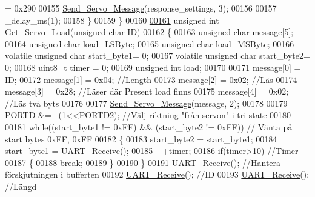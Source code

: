 \begin{DoxyCode}
{       = 0x290 }
00155         \hyperlink{servo___u_a_r_t_8c_a2ed3a2903977a774d1b174665d50661c}{Send\_Servo\_Message}(response\_settings, 3);
00156         
00157         \_delay\_ms(1);
00158     \}
00159 \}
00160 
\hypertarget{servo___u_a_r_t_8c_source.tex_l00161}{}\hyperlink{servo___u_a_r_t_8h_a1aae94381111766cdccb93eae5b5c382}{00161} \textcolor{keywordtype}{unsigned} \textcolor{keywordtype}{int} \hyperlink{servo___u_a_r_t_8c_a1aae94381111766cdccb93eae5b5c382}{Get\_Servo\_Load}(\textcolor{keywordtype}{unsigned} \textcolor{keywordtype}{char} ID)
00162 \{   
00163     \textcolor{keywordtype}{unsigned} \textcolor{keywordtype}{char} message[5];
00164     \textcolor{keywordtype}{unsigned} \textcolor{keywordtype}{char} load\_LSByte;
00165     \textcolor{keywordtype}{unsigned} \textcolor{keywordtype}{char} load\_MSByte;
00166     \textcolor{keyword}{volatile} \textcolor{keywordtype}{unsigned} \textcolor{keywordtype}{char} start\_byte1= 0;
00167     \textcolor{keyword}{volatile} \textcolor{keywordtype}{unsigned} \textcolor{keywordtype}{char} start\_byte2= 0; 
00168     uint8\_t timer = 0; 
00169     \textcolor{keywordtype}{unsigned} \textcolor{keywordtype}{int} \hyperlink{over__hinder_8c_a29122f6df4a054b8141015682f877c82}{load};
00170     
00171     message[0] = ID;
00172     message[1] = 0x04; \textcolor{comment}{//Length}
00173     message[2] = 0x02; \textcolor{comment}{//Läs}
00174     message[3] = 0x28; \textcolor{comment}{//Läser där Present load finns  }
00175     message[4] = 0x02; \textcolor{comment}{//Läs två byts}
00176     
00177     \hyperlink{servo___u_a_r_t_8c_a2ed3a2903977a774d1b174665d50661c}{Send\_Servo\_Message}(message, 2);
00178 
00179     PORTD &= ~(1<<PORTD2); \textcolor{comment}{//Välj riktning "från servon" i tri-state}
00180     
00181     \textcolor{keywordflow}{while}((start\_byte1 != 0xFF) && (start\_byte2 != 0xFF)) \textcolor{comment}{// Vänta på start bytes 0xFF, 0xFF}
00182     \{
00183         start\_byte2 = start\_byte1; 
00184         start\_byte1 = \hyperlink{servo___u_a_r_t_8c_ae61a7bb5a727a8605e5865fc36e4e26b}{UART\_Receive}();
00185         ++timer;
00186         \textcolor{keywordflow}{if}(timer>10) \textcolor{comment}{//Timer}
00187         \{
00188             \textcolor{keywordflow}{break};
00189         \}
00190     \}
00191     \hyperlink{servo___u_a_r_t_8c_ae61a7bb5a727a8605e5865fc36e4e26b}{UART\_Receive}(); \textcolor{comment}{//Hantera förskjutningen i bufferten}
00192     \hyperlink{servo___u_a_r_t_8c_ae61a7bb5a727a8605e5865fc36e4e26b}{UART\_Receive}(); \textcolor{comment}{//ID}
00193     \hyperlink{servo___u_a_r_t_8c_ae61a7bb5a727a8605e5865fc36e4e26b}{UART\_Receive}(); \textcolor{comment}{//Längd}

\end{DoxyCode}
